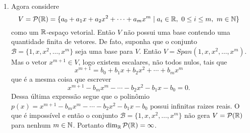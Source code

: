 \begin{exemplos}
\begin{enumerate}
		\item Agora considere
			\[
				V = \mathcal{P}(\mathbb{R}) = \{a_0 + a_1x + a_2x^2 + \cdots + a_mx^m \mid a_i \in \mathbb{R},\ 0 \le i \le m,\ m \in \mathbb{N}\}
			\]
			como um $\mathbb{R}$-espaço vetorial. Então $V$ não possui uma base contendo uma quantidade finita de vetores. De fato, suponha que o conjunto $\mathcal{B} = \{1, x, x^2, \dots, x^m\}$ seja uma base para $V$.
			Então $V = Span(1, x, x^2, \dots, x^m)$. Mas o vetor $x^{m + 1} \in V$, logo existem escalares, não todos nulos, tais que
			\[
				x^{m + 1} = b_0 + b_1x + b_2x^2 + \cdots + b_mx^m
			\]
			que é a mesma coisa que escrever
			\[
				x^{m + 1} - b_mx^m - \cdots - b_2x^2 - b_1x - b_0 = 0.
			\]
			Dessa última expressão segue que o polinômio $p(x) = x^{m + 1} - b_mx^m - \cdots - b_2x^2 - b_1x - b_0$ possui infinitas raizes reais. O que é impossível e então o 
			conjunto $\mathcal{B} = \{1, x, x^2, \dots, x^m\}$ não gera $V = \mathcal{P}(\mathbb{R})$ para nenhum $m \in \mathbb{N}$. Portanto $\dim_{\mathbb{R}}\mathcal{P}(\mathbb{R}) = \infty$.
	\end{enumerate}
\end{exemplos}
%
